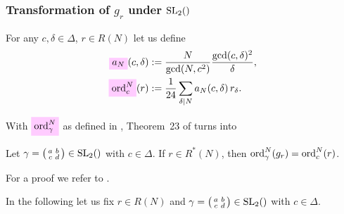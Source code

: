 \documentclass{article}
\begin{document}
\begin{Hemmecke}

\subsubsection{Transformation of $g_r$ under $\SL2Z$}
\label{sec:g_r-transformation}

\begin{Definition}
  For any $c, \delta \in\Delta$, $r\in R(N)$ let us define
  \begin{align}
    \defineNotation[a-N]{a_N}(c, \delta)
    &:= \frac{N}{\gcd(N, c^2)} \frac{\gcd(c,\delta)^2}{\delta},
      \notag\\
    \defineNotation[ord-c-N]{\ord_c^N}(r)
    &:= \frac{1}{24}\divisorsum{N} a_N(c, \delta) \, r_\delta.
    \label{eq:order-r}
  \end{align}
\end{Definition}

With $\defineNotation[ord-gamma-N]{\ord_\gamma^N}$ as defined in
\cite{Radu_RamanujanKolberg_2015}, Theorem~23 of
\cite{Radu_RamanujanKolberg_2015} turns into
\begin{Theorem}\label{thm:order}
  Let $\gamma =
  \bigl(
  \begin{smallmatrix}
    a & b\\
    c & d
  \end{smallmatrix}
  \bigr)
  \in \SL2Z$ with $c\in\Delta$.
  If $r \in R^*(N)$, then
  $\operatorname{ord}_\gamma^N(g_r) = \operatorname{ord}_c^N(r)$.
\end{Theorem}
For a proof we refer to
\cite[Proposition~3.2.8]{Ligozat_CourbesModulaires_1975}.

In the following let us fix $r \in R(N)$ and
$\gamma =
  \bigl(
  \begin{smallmatrix}
    a & b\\
    c & d
  \end{smallmatrix}
  \bigr)
  \in \SL2Z$ with $c \in \Delta$.


\end{Hemmecke}
\end{document}
